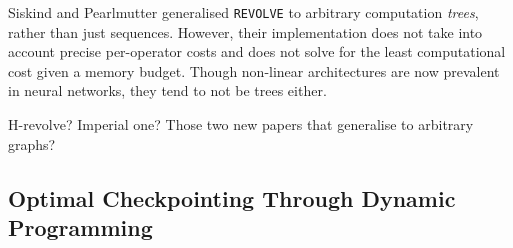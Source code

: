 Siskind and Pearlmutter \cite{Siskind2018} generalised \texttt{REVOLVE} to arbitrary computation \textit{trees}, rather than just sequences.
However, their implementation does not take into account precise per-operator costs and does not solve for the least computational cost given a memory budget.
Though non-linear architectures are now prevalent in neural networks, they tend to not be trees either.

 H-revolve? Imperial one? Those two new papers that generalise to arbitrary graphs?

\subsection{Optimal Checkpointing Through Dynamic Programming}
%
% 
% 
%
%


% 
